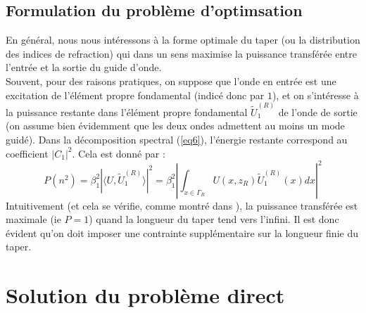 \documentclass{article}
\begin{document}
\subsection{Formulation du problème d'optimsation}
En général, nous nous intéressons à la forme optimale du taper (ou la distribution des indices de refraction) qui dans un sens maximise la puissance transférée entre l'entrée et la sortie du guide d'onde.\\
Souvent, pour des raisons pratiques, on suppose que l'onde en entrée est une excitation de l'élément propre fondamental (indicé donc par $1$), et on s'intéresse à la puissance restante dans l'élément propre fondamental $\tilde{U}^{(R)}_1$ de l'onde de sortie (on assume bien évidemment que les deux ondes admettent au moins un mode guidé). Dans la décomposition spectral (\ref{eq6}), l'énergie restante correspond au coefficient $|C_1|^2$. Cela est donné par :
\begin{equation}\label{eq11} P(n^2)=\beta_1^2|\langle U,\tilde{U}_1^{(R)}\rangle|^2=\beta_1^2\left|\int_{x\in\Gamma_R} U(x,z_R)\tilde{U}_1^{(R)}(x)dx\right|^2\end{equation}
Intuitivement (et cela se vérifie, comme montré dans \cite{Snyd}), la puissance transférée est maximale (ie $P=1$) quand la longueur du taper tend vers l'infini. Il est donc évident qu'on doit imposer une contrainte supplémentaire sur la longueur finie du taper.

\section{Solution du problème direct}
\end{document}
